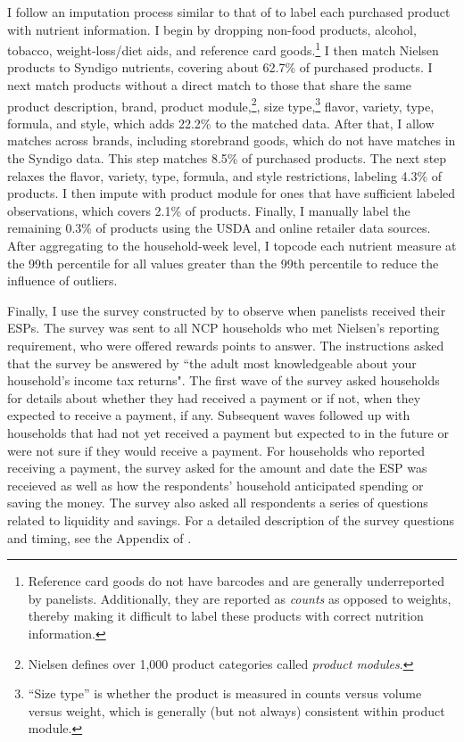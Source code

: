 \documentclass[12pt]{article}
\begin{document}
I follow an imputation process similar to that of \textcite{dubois2014prices} to label each purchased product with nutrient information. I begin by dropping non-food products, alcohol, tobacco, weight-loss/diet aids, and reference card goods.\footnote{Reference card goods do not have barcodes and are generally underreported by panelists. Additionally, they are reported as \textit{counts} as opposed to weights, thereby making it difficult to label these products with correct nutrition information.} %
I then match Nielsen products to Syndigo nutrients, covering about 62.7\% of purchased products. I next match products without a direct match to those that share the same product description, brand, product module,\footnote{Nielsen defines over 1,000 product categories called \textit{product modules}.}, size type,\footnote{``Size type'' is whether the product is measured in counts versus volume versus weight, which is generally (but not always) consistent within product module.} flavor, variety, type, formula, and style, which adds 22.2\% to the matched data. After that, I allow matches across brands, including storebrand goods, which do not have matches in the Syndigo data. This step matches 8.5\% of purchased products. The next step relaxes the flavor, variety, type, formula, and style restrictions, labeling 4.3\% of products. I then impute with product module for ones that have sufficient labeled observations, which covers 2.1\% of products. Finally, I manually label the remaining 0.3\% of products using the USDA and online retailer data sources. After aggregating to the household-week level, I topcode each nutrient measure at the 99th percentile for all values greater than the 99th percentile to reduce the influence of outliers.  %

Finally, I use the survey constructed by \textcite{broda2014economic} to observe when panelists received their ESPs. The survey was sent to all NCP households who met Nielsen's reporting requirement, who were offered rewards points to answer. The instructions asked that the survey be answered by ``the adult most knowledgeable about your household's income tax returns". The first wave of the survey asked households for details about whether they had received a payment or if not, when they expected to receive a payment, if any. Subsequent waves followed up with households that had not yet received a payment but expected to in the future or were not sure if they would receive a payment. For households who reported receiving a payment, the survey asked for the amount and date the ESP was receieved as well as how the respondents' household anticipated spending or saving the money. The survey also asked all respondents a series of questions related to liquidity and savings. For a detailed description of the survey questions and timing, see the Appendix of \textcite{broda2014economic}.
\end{document}
